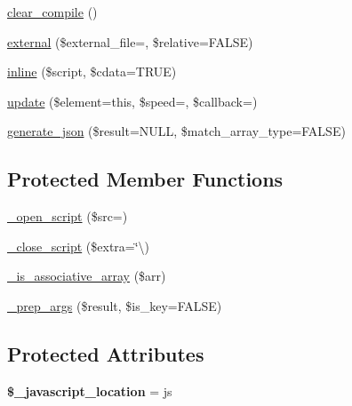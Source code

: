 \begin{DoxyCompactItemize}
\mbox{\hyperlink{class_c_i___javascript_ac01545c6c79fde0762903c03db793c71}{clear\+\_\+compile}} ()
\item 
\mbox{\hyperlink{class_c_i___javascript_aca18a8a99e45d211da9c55fc4e16db7b}{external}} (\$external\+\_\+file=\textquotesingle{}\textquotesingle{}, \$relative=F\+A\+L\+SE)
\item 
\mbox{\hyperlink{class_c_i___javascript_a6906f94e810ddefdb0541d6e43c93620}{inline}} (\$script, \$cdata=T\+R\+UE)
\item 
\mbox{\hyperlink{class_c_i___javascript_ac1a836d0e98888f9ff961140bdf21137}{update}} (\$element=\textquotesingle{}this\textquotesingle{}, \$speed=\textquotesingle{}\textquotesingle{}, \$callback=\textquotesingle{}\textquotesingle{})
\item 
\mbox{\hyperlink{class_c_i___javascript_ab2156840670feefa550596f3c2df6a2a}{generate\+\_\+json}} (\$result=N\+U\+LL, \$match\+\_\+array\+\_\+type=F\+A\+L\+SE)
\end{DoxyCompactItemize}
\subsection*{Protected Member Functions}
\begin{DoxyCompactItemize}
\item 
\mbox{\hyperlink{class_c_i___javascript_a394ba284502309b86ee279bb8e3e0b7d}{\+\_\+open\+\_\+script}} (\$src=\textquotesingle{}\textquotesingle{})
\item 
\mbox{\hyperlink{class_c_i___javascript_a832d6a934327dd68ab2d46004702df82}{\+\_\+close\+\_\+script}} (\$extra=\char`\"{}\textbackslash{})
\item 
\mbox{\hyperlink{class_c_i___javascript_a229c068a6bfb56eb1fad0e36602954b6}{\+\_\+is\+\_\+associative\+\_\+array}} (\$arr)
\item 
\mbox{\hyperlink{class_c_i___javascript_a2e877f31dbe84547525e9a75ee297229}{\+\_\+prep\+\_\+args}} (\$result, \$is\+\_\+key=F\+A\+L\+SE)
\end{DoxyCompactItemize}
\subsection*{Protected Attributes}
\begin{DoxyCompactItemize}
\item 
\mbox{\label{class_c_i___javascript_aeae6c513d48d3fcda1897d1e79b3c646}} 
{\bfseries \$\+\_\+javascript\+\_\+location} = \textquotesingle{}js\textquotesingle{}
\end{DoxyCompactItemize}


